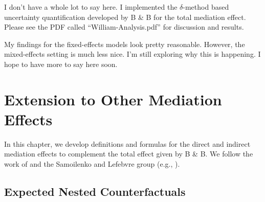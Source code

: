 \documentclass{report}
\begin{document}
I don't have a whole lot to say here. I implemented the $\delta$-method based uncertainty quantification developed by B \& B for the total mediation effect. Please see the PDF called ``William-Analysis.pdf'' for discussion and results.

My findings for the fixed-effects models look pretty reasonable. However, the mixed-effects setting is much less nice. I'm still exploring why this is happening. I hope to have more to say here soon.



\chapter{Extension to Other Mediation Effects}

In this chapter, we develop definitions and formulas for the direct and indirect mediation effects to complement the total effect given by B \& B. We follow the work of \citet{Pea12} and the Samoilenko and Lefebvre group (e.g., \citealp{Sam23}). 

\section{Expected Nested Counterfactuals}
\label{sec:nest_CFs}
\end{document}
